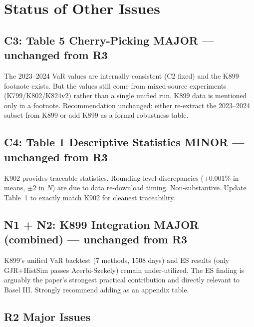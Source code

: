 \documentclass[12pt,a4paper]{article}
\begin{document}
\section*{Status of Other Issues}

\subsection*{C3: Table 5 Cherry-Picking \hfill \textcolor{warncolor}{MAJOR --- unchanged from R3}}

The 2023--2024 VaR values are internally consistent (C2 fixed) and the K899 footnote exists. But the values still come from mixed-source experiments (K799/K802/K824v2) rather than a single unified run. K899 data is mentioned only in a footnote. Recommendation unchanged: either re-extract the 2023--2024 subset from K899 or add K899 as a formal robustness table.

\subsection*{C4: Table 1 Descriptive Statistics \hfill \textcolor{resolved}{MINOR --- unchanged from R3}}

K902 provides traceable statistics. Rounding-level discrepancies ($\pm 0.001\%$ in means, $\pm 2$ in $N$) are due to data re-download timing. Non-substantive. Update Table~1 to exactly match K902 for cleanest traceability.

\subsection*{N1 + N2: K899 Integration \hfill \textcolor{warncolor}{MAJOR (combined) --- unchanged from R3}}

K899's unified VaR backtest (7 methods, 1508 days) and ES results (only GJR+HistSim passes Acerbi-Szekely) remain under-utilized. The ES finding is arguably the paper's strongest practical contribution and directly relevant to Basel III. Strongly recommend adding as an appendix table.

\subsection*{R2 Major Issues}
\end{document}
